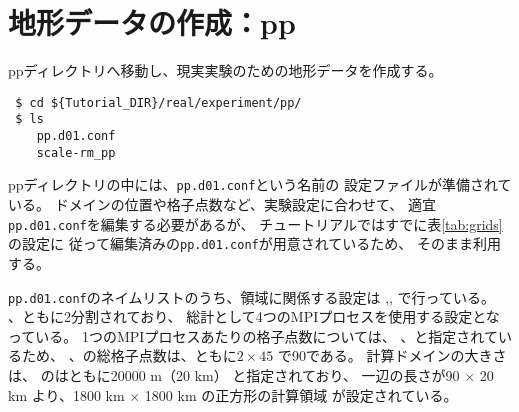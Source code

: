 \section{地形データの作成：pp} \label{sec:tutrial_real_pp}

ppディレクトリへ移動し、現実実験のための地形データを作成する。
\begin{verbatim}
 $ cd ${Tutorial_DIR}/real/experiment/pp/
 $ ls
    pp.d01.conf
    scale-rm_pp
\end{verbatim}
ppディレクトリの中には、\verb|pp.d01.conf|という名前の
設定ファイルが準備されている。
ドメインの位置や格子点数など、実験設定に合わせて、
適宜\verb|pp.d01.conf|を編集する必要があるが、
チュートリアルではすでに表\ref{tab:grids}の設定に
従って編集済みの\verb|pp.d01.conf|が用意されているため、
そのまま利用する。

\verb|pp.d01.conf|のネイムリストのうち、領域に関係する設定は
,,
で行っている。
{\XDIR} 、{\YDIR}ともに2分割されており、
総計として4つのMPIプロセスを使用する設定となっている。
1つのMPIプロセスあたりの格子点数については、
、と指定されているため、
{\XDIR} 、{\YDIR}の総格子点数は、ともに$2 \times 45$ で90である。
計算ドメインの大きさは、
のはともに20000 m（20 km）
と指定されており、
一辺の長さが90 $\times$ 20 km より、1800 km $\times$ 1800 km の正方形の計算領域
が設定されている。\\

